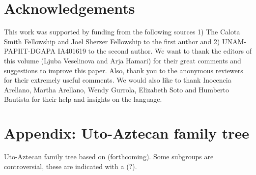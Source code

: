 \documentclass[output=paper,draft,draftmode,colorlinks,citecolor=brown]{langscibook}
\begin{document}
\section*{Acknowledgements}
This work was supported by funding from the following sources 1) The Calota Smith Fellowship and Joel Sherzer Fellowship to the first author and 2) UNAM-PAPIIT-DGAPA IA401619 to the second author. We want to thank the editors of this volume (Ljuba Veselinova and Arja Hamari) for their great comments and
suggestions to improve this paper. Also, thank you to the anonymous reviewers for their extremely
useful comments. We would also like to thank Inocencia Arellano, Martha Arellano, Wendy Gurrola, Elizabeth Soto and Humberto Bautista for their help and insights on the language.

\newpage
\section*{Appendix: Uto-Aztecan family tree}
Uto-Aztecan family tree based on \citeauthor{haugen2019} (forthcoming). Some subgroups are controversial, these are indicated with a (?). 



\medskip
\end{document}
